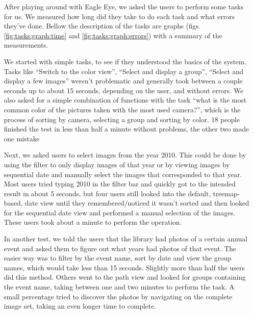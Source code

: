 After playing around with Eagle Eye, we asked the users to perform some tasks for us. We measured how long did they take to do each task and what errors they've done. Bellow the description of the tasks are graphs (figs. \ref{fig:tasks:graph:time} and \ref{fig:tasks:graph:errors}) with a summary of the measurements.

We started with simple tasks, to see if they understood the basics of the system. Tasks like ``Switch to the color view'', ``Select and display a group'', ``Select and display a few images'' weren't problematic and generally took between a couple seconds up to about 15 seconds, depending on the user, and without errors. We also asked for a simple combination of functions with the task ``what is the most common color of the pictures taken with the most used camera?'', which is the process of sorting by camera, selecting a group and sorting by color. 18 people finished the test in less than half a minute without problems, the other two made one mistake 

Next, we asked users to select images from the year 2010. This could be done by using the filter to only display images of that year or by viewing images by sequential date and manually select the images that corresponded to that year. Most users tried typing 2010 in the filter bar and quickly got to the intended result in about 5 seconds, but four users still looked into the default, treemap-based, date view until they remembered/noticed it wasn't sorted and then looked for the sequential date view and performed a manual selection of the images. These users took about a minute to perform the operation.

In another test, we told the users that the library had photos of a certain annual event and asked them to figure out what years had photos of that event. The easier way was to filter by the event name, sort by date and view the group names, which would take less than 15 seconds. Slightly more than half the users did this method. Others went to the path view and looked for groups containing the event name, taking between one and two minutes to perform the task. A small percentage tried to discover the photos by navigating on the complete image set, taking an even longer time to complete.



